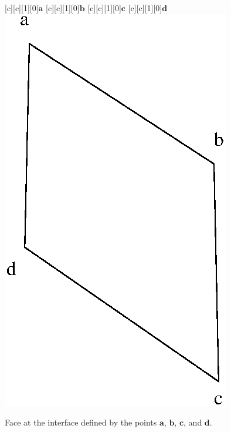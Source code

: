 \documentclass{warpdoc}
\newlength\lengthfigure                  %
\renewcommand{\fontsizefigure}{\footnotesize}
\renewcommand{\vec}[1]{\bm{#1}}
\begin{document}
%
\begin{figure}
   \fontsizefigure\center
   [c][c][1][0]{$\vec{a}$}
   [c][c][1][0]{$\vec{b}$}
   [c][c][1][0]{$\vec{c}$}
   [c][c][1][0]{$\vec{d}$}
   \includegraphics[width=1.0\lengthfigure]{interface.eps}
\caption{Face at the interface defined by the points $\vec{a}$, $\vec{b}$, $\vec{c}$, and $\vec{d}$.}
\label{fig:interface}
\end{figure}
\end{document}

